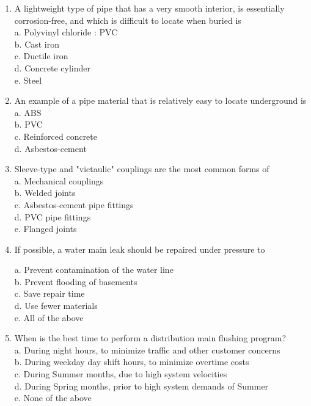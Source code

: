 \begin{enumerate}[1.]
  \item A lightweight type of pipe that has a very smooth interior, is essentially corrosion-free, and which is difficult to locate when buried is\\
a. Polyvinyl chloride : PVC\\
b. Cast iron\\
c. Ductile iron\\
d. Concrete cylinder\\
e. Steel\\

  \item An example of a pipe material that is relatively easy to locate underground is\\
a. ABS\\
b. PVC\\
c. Reinforced concrete \\
d. Asbestos-cement\\

\item Sleeve-type and "victaulic" couplings are the most common forms of\\

a. Mechanical couplings\\

b. Welded joints\\

c. Asbestos-cement pipe fittings\\

d. PVC pipe fittings\\

e. Flanged joints\\

\item If possible, a water main leak should be repaired under pressure to

a. Prevent contamination of the water line\\

b. Prevent flooding of basements\\

c. Save repair time\\

d. Use fewer materials\\

e. All of the above\\

\item When is the best time to perform a distribution main flushing program?\\
a. During night hours, to minimize traffic and other customer concerns\\
b. During weekday day shift hours, to minimize overtime costs\\
c. During Summer months, due to high system velocities\\
d. During Spring months, prior to high system demands of Summer\\
e. None of the above\\


\end{enumerate}
